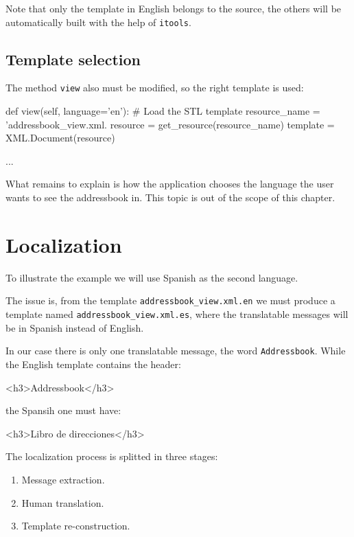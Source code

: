 Note that only the template in English belongs to the source, the others
will be automatically built with the help of {\tt itools}.

\subsection{Template selection}

The method {\tt view} also must be modified, so the right template is used:

\begin{code}
    def view(self, language='en'):
        # Load the STL template
        resource_name = 'addressbook_view.xml.%
        resource = get_resource(resource_name)
        template = XML.Document(resource)

        ...
\end{code}


What remains to explain is how the application chooses the language the
user wants to see the addressbook in. This topic is out of the scope
of this chapter.

\section{Localization}

To illustrate the example we will use Spanish as the second language.

The issue is, from the template {\tt addressbook\_view.xml.en} we
must produce a template named {\tt addressbook\_view.xml.es}, where
the translatable messages will be in Spanish instead of English.

In our case there is only one translatable message, the word
{\tt Addressbook}. While the English template contains the header:

\begin{code}
    <h3>Addressbook</h3>
\end{code}

the Spansih one must have:

\begin{code}
    <h3>Libro de direcciones</h3>
\end{code}

The localization process is splitted in three stages:

\begin{enumerate}
  \item Message extraction.
  \item Human translation.
  \item Template re-construction.
\end{enumerate}

